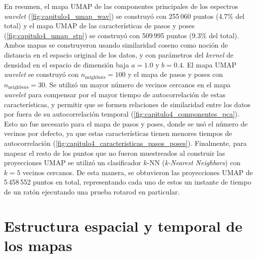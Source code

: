 En resumen, el mapa UMAP de las componentes principales de los espectros \textit{wavelet} (\autoref{fig:capitulo4_umap_wav}) se construyó con 255\,060 puntos (4.7\% del total) y el mapa UMAP de las características de pasos y poses (\autoref{fig:capitulo4_umap_stp}) se construyó con 509\,995 puntos (9.3\% del total). Ambos mapas se construyeron usando similaridad coseno como noción de distancia en el espacio original de los datos, y con parámetros del \textit{kernel} de densidad en el espacio de dimensión baja $a=1.0$ y $b=0.4$. El mapa UMAP \textit{wavelet} se construyó con $n_{\mathrm{neighbors}}=100$ y el mapa de pasos y poses con $n_{\mathrm{neighbors}}=30$. Se utilizó un mayor número de vecinos cercanos en el mapa \textit{wavelet} para compensar por el mayor tiempo de autocorrelación de estas características, y permitir que se formen relaciones de similaridad entre los datos por fuera de su autocorrelación temporal (\autoref{fig:capitulo4_componentes_pca}). Esto no fue necesario para el mapa de pasos y poses, donde se usó el número de vecinos por defecto, ya que estas características tienen menores tiempos de autocorrelación (\autoref{fig:capitulo4_caracteristicas_pasos_poses}). Finalmente, para mapear el resto de los puntos que no fueron muestreados al construir las proyecciones UMAP se utilizó un clasificador $k$-NN (\textit{k-Nearest Neighbors}) con $k=5$ vecinos cercanos. De esta manera, se obtuvieron las proyecciones UMAP de 5\,458\,552 puntos en total, representando cada uno de estos un instante de tiempo de un ratón ejecutando una prueba rotarod en particular.

\section{Estructura espacial y temporal de los mapas}\label{sec:umap_trans}

